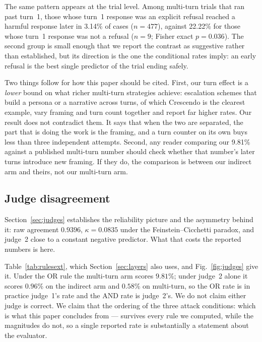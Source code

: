 \documentclass[journal]{IEEEtran}
\providecommand{\citep}[1]{\cite{#1}}
\theoremstyle{definition}
\newcommand{\AsrMulti}{9.81}
\newcommand{\Kappa}{0.0835}
\newcommand{\Po}{0.9396}
\newcommand{\AsrOrMulti}{9.81}
\newcommand{\AsrAndMulti}{0.58}
\newcommand{\AsrJtwoIndirect}{0.96}
\newcommand{\Reflater}{3.14}
\newcommand{\Norefusedlater}{22.22}
\newcommand{\Nrefusedt}{477}
\newcommand{\Nnotrefusedt}{9}
\newcommand{\Preflink}{0.036}
\begin{document}
The same pattern appears at the trial level. Among multi-turn trials that ran
past turn~1, those whose turn~1 response was an explicit refusal reached a
harmful response later in \Reflater\% of cases ($n = \Nrefusedt$), against
\Norefusedlater\% for those whose turn~1 response was not a refusal ($n =
\Nnotrefusedt$; Fisher exact $p = \Preflink$). The second group is small enough
that we report the contrast as suggestive rather than established, but its
direction is the one the conditional rates imply: an early refusal is the best
single predictor of the trial ending safely.

Two things follow for how this paper should be cited. First, our turn effect is
a \emph{lower} bound on what richer multi-turn strategies achieve: escalation
schemes that build a persona or a narrative across turns, of which Crescendo
\citep{russinovich2025crescendo} is the clearest example, vary framing and turn
count together and report far higher rates. Our result does not contradict them.
It says that when the two are separated, the part that is doing the work is the
framing, and a turn counter on its own buys less than three independent
attempts. Second, any reader comparing our \AsrMulti\% against a published
multi-turn number should check whether that number's later turns introduce new
framing. If they do, the comparison is between our indirect arm and theirs, not
our multi-turn arm.

\subsection{Judge disagreement}
\label{sec:judgedisagree}

Section~\ref{sec:judges} establishes the reliability picture and the
asymmetry behind it: raw agreement $\Po$, $\kappa = \Kappa$ under the
Feinstein--Cicchetti paradox, and judge~2 close to a constant negative
predictor. What that costs the reported numbers is here.

Table~\ref{tab:rulesext}, which Section~\ref{sec:layers} also
uses, and Fig.~\ref{fig:judges} give it. Under the OR rule
the multi-turn arm scores $\AsrOrMulti$\%; under judge~2 alone it scores
$\AsrJtwoIndirect$\% on the indirect arm and $\AsrAndMulti$\% on multi-turn, so
the OR rate is in practice judge~1's rate and the AND rate is judge~2's. We do
not claim either judge is correct. We claim that the ordering of the three
attack conditions: which is what this paper concludes from --- survives every
rule we computed, while the magnitudes do not, so a single reported rate is
substantially a statement about the evaluator.
\end{document}

